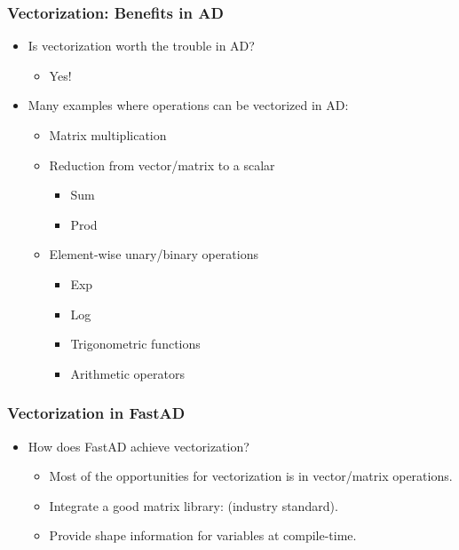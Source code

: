 \begin{frame}
\frametitle{Vectorization: Benefits in AD}
\begin{itemize}

\item Is vectorization worth the trouble in AD?\@
    \begin{itemize}
        \item Yes!
    \end{itemize}
\item Many examples where operations can be vectorized in AD:\@
    \begin{itemize}
        \item Matrix multiplication
        \item Reduction from vector/matrix to a scalar
            \begin{itemize}
                \item Sum
                \item Prod
            \end{itemize}
        \item Element-wise unary/binary operations 
            \begin{itemize}
                \item Exp
                \item Log
                \item Trigonometric functions
                \item Arithmetic operators
            \end{itemize}
    \end{itemize}

\end{itemize}
\end{frame}

\begin{frame}
\frametitle{Vectorization in FastAD}
\begin{itemize}

\item{How does FastAD achieve vectorization?}
    \begin{itemize}
        \item Most of the opportunities for vectorization is in vector/matrix operations.
        \item Integrate a good matrix library:  (industry standard).

        \item Provide shape information for variables at compile-time.
    \end{itemize}

\end{itemize}
\end{frame}

